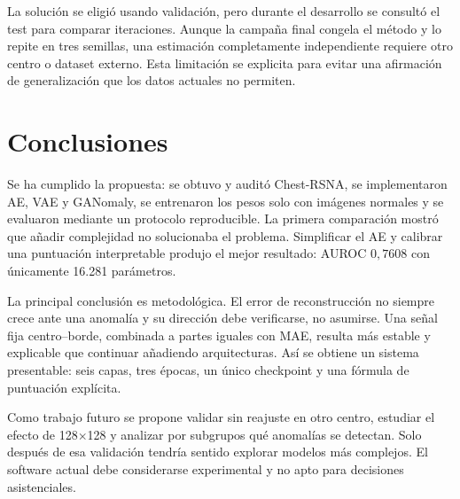 \documentclass[10pt,a4paper,twocolumn]{article}
\begin{document}
La solución se eligió usando validación, pero durante el desarrollo se consultó
el test para comparar iteraciones. Aunque la campaña final congela el método y
lo repite en tres semillas, una estimación completamente independiente requiere
otro centro o dataset externo. Esta limitación se explicita para evitar una
afirmación de generalización que los datos actuales no permiten.

\section{Conclusiones}

Se ha cumplido la propuesta: se obtuvo y auditó Chest-RSNA, se implementaron
AE, VAE y GANomaly, se entrenaron los pesos solo con imágenes normales y se
evaluaron mediante un protocolo reproducible. La primera comparación mostró que
añadir complejidad no solucionaba el problema. Simplificar el AE y calibrar una
puntuación interpretable produjo el mejor resultado: AUROC
$0{,}7608$ con únicamente 16.281 parámetros.

La principal conclusión es metodológica. El error de reconstrucción no siempre
crece ante una anomalía y su dirección debe verificarse, no asumirse. Una señal
fija centro--borde, combinada a partes iguales con MAE, resulta más estable y
explicable que continuar añadiendo arquitecturas. Así se obtiene un sistema
presentable: seis capas, tres épocas, un único checkpoint y una fórmula de
puntuación explícita.

Como trabajo futuro se propone validar sin reajuste en otro centro, estudiar el
efecto de 128$\times$128 y analizar por subgrupos qué anomalías se detectan. Solo
después de esa validación tendría sentido explorar modelos más complejos. El
software actual debe considerarse experimental y no apto para decisiones
asistenciales.

\printbibliography[title={Bibliografía}]
\end{document}
